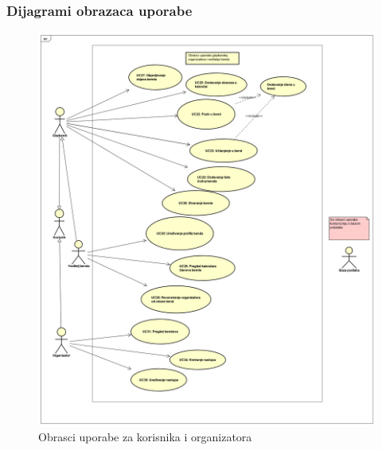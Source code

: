 				\subsubsection{Dijagrami obrazaca uporabe}	
				
				\begin{figure}[H]
				\begin{center}
					\includegraphics[width=17cm]{slike/glazbenik_organizator.PNG}
				\end{center}
				\caption{Obrasci uporabe za korisnika i organizatora}
				\label{fig:ou1}
			\end{figure}
		
